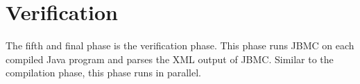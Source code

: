 \section{Verification}
The fifth and final phase is the verification phase. This phase runs JBMC on
each compiled Java program and parses the XML output of JBMC. Similar to the
compilation phase, this phase runs in parallel.